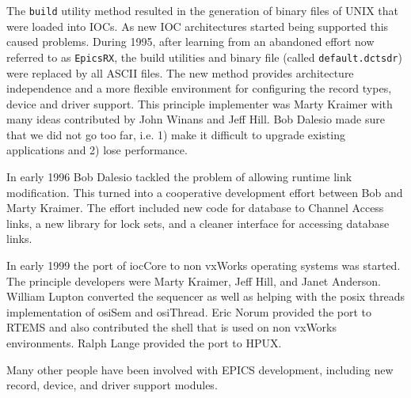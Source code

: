 The \verb|build| utility method resulted in the generation of binary files of UNIX that were loaded into IOCs.
As new IOC architectures started being supported this caused problems.
During 1995, after learning from an abandoned effort now referred to as \verb|EpicsRX|, the build utilities and binary file (called \verb|default.dctsdr|) were replaced by all ASCII files.
The new method provides architecture independence and a more flexible environment for configuring the record types, device and driver support.
This principle implementer was Marty Kraimer with many ideas contributed by John Winans and Jeff Hill.
Bob Dalesio made sure that we did not go too far, i.e. 1) make it difficult to upgrade existing applications and 2) lose performance.

In early 1996 Bob Dalesio tackled the problem of allowing runtime link modification.
This turned into a cooperative development effort between Bob and Marty Kraimer.
The effort included new code for database to Channel Access links, a new library for lock sets, and a cleaner interface for accessing database links.

In early 1999 the port of iocCore to non vxWorks operating systems was started.
The principle developers were Marty Kraimer, Jeff Hill, and Janet Anderson.
William Lupton converted the sequencer as well as helping with the posix threads implementation of osiSem and osiThread.
Eric Norum provided the port to RTEMS and also contributed the shell that is used on non vxWorks environments.
Ralph Lange provided the port to HPUX.

Many other people have been involved with EPICS development, including new record, device, and driver support modules.
